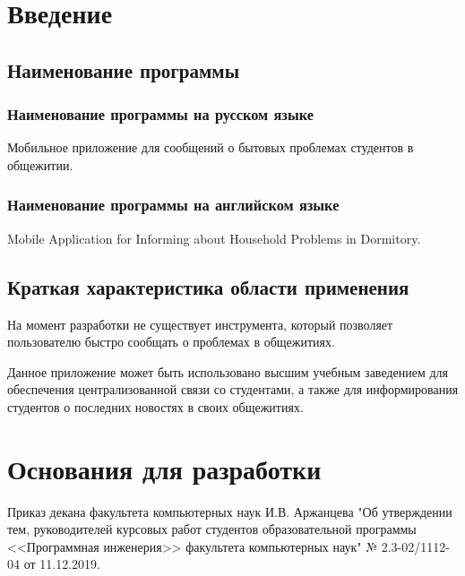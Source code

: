 \section{Введение}

\subsection{Наименование программы}

\subsubsection{Наименование программы на русском языке}

Мобильное приложение для сообщений о бытовых проблемах студентов в общежитии.

\subsubsection{Наименование программы на английском языке}

Mobile Application for Informing about Household Problems in Dormitory.

\subsection{Краткая характеристика области применения}

На момент разработки не существует инструмента, который позволяет пользователю быстро сообщать о проблемах в общежитиях.

Данное приложение может быть использовано высшим учебным заведением для обеспечения централизованной связи со студентами, а
также для информирования студентов о последних новостях в своих общежитиях.


\section{Основания для разработки}

Приказ декана факультета компьютерных наук И.В. Аржанцева "Об утверждении тем, руководителей курсовых работ студентов образовательной программы <<Программная инженерия>> факультета компьютерных наук" № 2.3-02/1112-04 от 11.12.2019.
